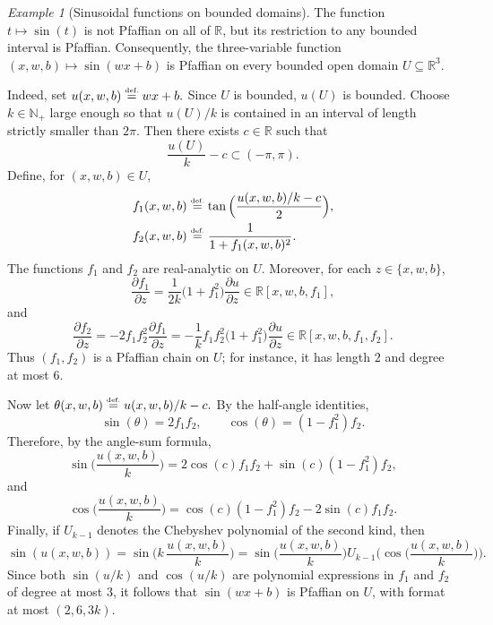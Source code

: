 \documentclass{article}
\newcommand{\eqdef}{\ensuremath{\stackrel{\mbox{\upshape\tiny def.}}{=}}}
\theoremstyle{plain}
\theoremstyle{definition}
\theoremstyle{remark}
\newtheorem{example}{Example}
\newcommand{\reals}{\mathbb{R}}
\theoremstyle{plain}
\numberwithin{thm}{section}
\theoremstyle{definition}
\numberwithin{equation}{section}
\begin{document}
\begin{example}[Sinusoidal functions on bounded domains]
\label{ex:bounded_sine_pfaffian}
The function $t\mapsto \sin(t)$ is not Pfaffian on all of $\reals$, but its restriction to any bounded interval is Pfaffian.  Consequently, the three-variable function
$
    (x,w,b)\mapsto \sin(wx+b)
$
is Pfaffian on every bounded open domain $U\subseteq\reals^3$.

Indeed, set
$
    u(x,w,b)\eqdef wx+b.
$
Since $U$ is bounded, $u(U)$ is bounded.  Choose $k\in\mathbb{N}_+$ large enough so that $u(U)/k$ is contained in an interval of length strictly smaller than $2\pi$.  Then there exists $c\in\reals$ such that
$$
    \frac{u(U)}{k}-c
    \subset
        (-\pi,\pi).
$$
Define, for $(x,w,b)\in U$,
\begin{align*}
    f_1(x,w,b)
    &\eqdef
        \tan\Big(
            \frac{u(x,w,b)/k-c}{2}
        \Big),\\
    f_2(x,w,b)
    &\eqdef
        \frac{1}{1+f_1(x,w,b)^2}.
\end{align*}
The functions $f_1$ and $f_2$ are real-analytic on $U$.  Moreover, for each $z\in\{x,w,b\}$,
$$
    \frac{\partial f_1}{\partial z}
    =
        \frac{1}{2k}
        \big(1+f_1^2\big)
        \frac{\partial u}{\partial z}
    \in
        \reals[x,w,b,f_1],
$$
and
$$
    \frac{\partial f_2}{\partial z}
    =
        -2f_1f_2^2
        \frac{\partial f_1}{\partial z}
    =
        -\frac{1}{k}
        f_1f_2^2
        \big(1+f_1^2\big)
        \frac{\partial u}{\partial z}
    \in
        \reals[x,w,b,f_1,f_2].
$$
Thus $(f_1,f_2)$ is a Pfaffian chain on $U$; for instance, it has length $2$ and degree at most $6$.

Now let
$
    \theta(x,w,b)\eqdef u(x,w,b)/k-c.
$
By the half-angle identities,
$$
    \sin(\theta)
    =
        2f_1f_2,
    \qquad
    \cos(\theta)
    =
        (1-f_1^2)f_2.
$$
Therefore, by the angle-sum formula,
$$
    \sin\Big(\frac{u(x,w,b)}{k}\Big)
    =
        2\cos(c)f_1f_2
        +
        \sin(c)(1-f_1^2)f_2,
$$
and
$$
    \cos\Big(\frac{u(x,w,b)}{k}\Big)
    =
        \cos(c)(1-f_1^2)f_2
        -
        2\sin(c)f_1f_2.
$$
Finally, if $U_{k-1}$ denotes the Chebyshev polynomial of the second kind, then
$$
    \sin(u(x,w,b))
    =
        \sin\Big(k\,\frac{u(x,w,b)}{k}\Big)
    =
        \sin\Big(\frac{u(x,w,b)}{k}\Big)
        U_{k-1}\Big(
            \cos\Big(\frac{u(x,w,b)}{k}\Big)
        \Big).
$$
Since both $\sin(u/k)$ and $\cos(u/k)$ are polynomial expressions in $f_1$ and $f_2$ of degree at most $3$, it follows that $\sin(wx+b)$ is Pfaffian on $U$, with format at most $(2,6,3k)$.
\end{example}
\end{document}

